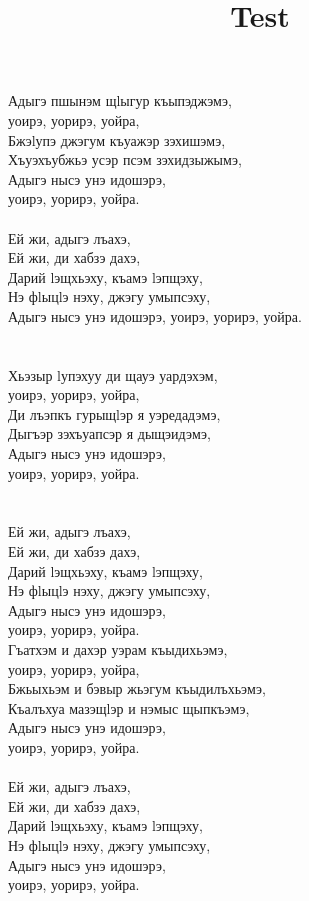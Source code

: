 \documentclass[a4paper,12pt]{book}
\title{Test}
\newcommand{\1}[1]{\textbf{\emph{#1}}} %
\newcommand{\2}[1]{\textbf{[#1]}} %
\newcommand{\3}[1]{\fontsize{11pt}{0cm}\textbf{\emph{#1}}} %
\newcommand{\4}[1]{\fontsize{10pt}{0cm}\emph{#1}}	%
\newcommand{\5}[1]{\textbf{/#1/}} %
\newcommand{\6}[1]{\textbf{[#1]}} %
\newcommand{\7}[1]{\fontsize{12pt}{0cm}\emph{#1}} %
\newcommand{\8}[1]{\fontsize{12pt}{0cm}`#1'} %
\newcommand{\9}[1]{\fontsize{12pt}{0cm}(lit. `#1')} %
\begin{document}
\frontmatter
\maketitle\newpage
\setcounter{secnumdepth}{4}
\setcounter{tocdepth}{4}

\newpage
\mainmatter


Адыгэ пшынэм щlыгур къыпэджэмэ, \\
уоирэ, уорирэ, уойра,\\
Бжэlупэ джэгум къуажэр зэхишэмэ,\\
Хъуэхъубжьэ усэр псэм зэхидзыжымэ,\\
Адыгэ нысэ унэ идошэрэ, \\
уоирэ, уорирэ, уойра.\\
\\
Ей жи, адыгэ лъахэ,\\
Ей жи, ди хабзэ дахэ,\\
Дарий lэщхьэху, къамэ lэпщэху,\\
Нэ фlыцlэ нэху, джэгу умыпсэху,\\
Адыгэ нысэ унэ идошэрэ, уоирэ, уорирэ, уойра.\\
\\\\
Хьэзыр lупэхуу ди щауэ уардэхэм,\\
уоирэ, уорирэ, уойра,\\
Ди лъэпкъ гурыщlэр я уэредадэмэ,\\
Дыгъэр зэхъуапсэр я дыщэидэмэ,\\
Адыгэ нысэ унэ идошэрэ,\\
уоирэ, уорирэ, уойра.\\
\\\\
Ей жи, адыгэ лъахэ,\\
Ей жи, ди хабзэ дахэ,\\
Дарий lэщхьэху, къамэ lэпщэху,\\
Нэ фlыцlэ нэху, джэгу умыпсэху,\\
Адыгэ нысэ унэ идошэрэ,\\
уоирэ, уорирэ, уойра.\\

Гъатхэм и дахэр уэрам къыдихьэмэ,\\
уоирэ, уорирэ, уойра,\\
Бжьыхьэм и бэвыр жьэгум къыдилъхьэмэ,\\
Къалъхуа мазэщlэр и нэмыс щыпкъэмэ,\\
Адыгэ нысэ унэ идошэрэ,\\
уоирэ, уорирэ, уойра.\\
\\
Ей жи, адыгэ лъахэ,\\
Ей жи, ди хабзэ дахэ,\\
Дарий lэщхьэху, къамэ lэпщэху,\\
Нэ фlыцlэ нэху, джэгу умыпсэху,\\
Адыгэ нысэ унэ идошэрэ,\\
уоирэ, уорирэ, уойра.\\
\end{document}
